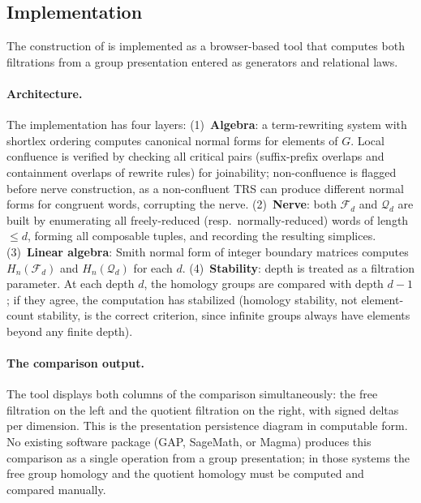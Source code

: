 \documentclass{article}
\theoremstyle{definition}
\theoremstyle{remark}
\begin{document}
\subsection{Implementation}
\label{sec:persistent_impl}

The construction of  is implemented as a
browser-based tool that computes both filtrations from a
group presentation entered as generators and relational laws.

\paragraph{Architecture.}
The implementation has four layers:
(1)~\textbf{Algebra}: a term-rewriting system with shortlex
ordering computes canonical normal forms for elements of $G$.
Local confluence is verified by checking all critical pairs
(suffix-prefix overlaps and containment overlaps of rewrite rules)
for joinability; non-confluence is flagged before nerve
construction, as a non-confluent TRS can produce different normal
forms for congruent words, corrupting the nerve.
(2)~\textbf{Nerve}: both $\mathcal{F}_d$ and $\mathcal{Q}_d$ are
built by enumerating all freely-reduced (resp.\ normally-reduced)
words of length $\leq d$, forming all composable tuples, and
recording the resulting simplices.
(3)~\textbf{Linear algebra}: Smith normal form of integer boundary
matrices computes $H_n(\mathcal{F}_d)$ and $H_n(\mathcal{Q}_d)$
for each $d$.
(4)~\textbf{Stability}: depth is treated as a filtration parameter.
At each depth $d$, the homology groups are compared with depth
$d-1$; if they agree, the computation has stabilized (homology
stability, not element-count stability, is the correct criterion,
since infinite groups always have elements beyond any finite depth).

\paragraph{The comparison output.}
The tool displays both columns of the comparison simultaneously:
the free filtration on the left and the quotient filtration on
the right, with signed deltas per dimension. This is the
presentation persistence diagram in computable form. No existing
software package (GAP, SageMath, or Magma) produces this
comparison as a single operation from a group presentation; in
those systems the free group homology and the quotient homology
must be computed and compared manually.
\end{document}

